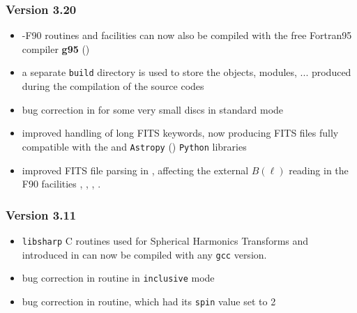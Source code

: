 \documentclass[12pt,twoside]{article}
\newcommand{\compresslist}{%
\setlength{\itemsep}{0ex}}{}
\begin{document}
{%
\subsubsection{Version 3.20} %
\label{sub:new3p20}
\begin{itemize}\compresslist
	\item \healpixns-F90 routines and facilities can now also be compiled with
the free Fortran95 compiler \textbf{g95} ()
	\item a separate {\tt build} directory is used to store the objects,
modules, ... produced during the compilation of the source codes
	\item bug correction in  for
some very small discs in standard mode
	\item improved handling of long FITS keywords, now producing FITS files
fully compatible with the
and 
{\tt Astropy} ()
{\tt Python} libraries
	\item improved FITS file parsing in 
,
affecting the external $B(\ell)$ reading in the F90 facilities 
, 
, 
, 
.
\end{itemize}

\subsubsection{Version 3.11} %
\label{sub:new3p11}
\begin{itemize}\compresslist
	\item {\tt libsharp} C routines used for Spherical Harmonics Transforms 
	and introduced in 
	can now be compiled with any {\tt gcc} version.
	\item bug correction in 
	routine in {\tt inclusive} mode
	\item bug correction in  
	routine, which had its {\tt spin} value set to 2
\end{itemize}

}
\end{document}
